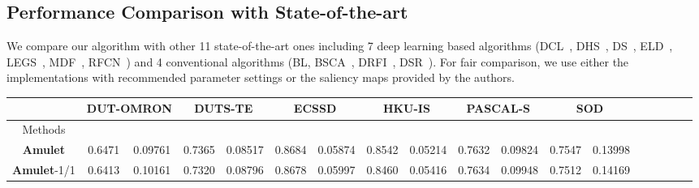 \documentclass[10pt,twocolumn,letterpaper]{article}
\begin{document}
\subsection{Performance Comparison with State-of-the-art}
We compare our algorithm with other 11 state-of-the-art ones including 7 deep learning based algorithms (DCL~\cite{LiYu16}, DHS~\cite{liu2016dhsnet}, DS~\cite{Li2016DeepSaliency}, ELD~\cite{lee2016deep}, LEGS~\cite{wang2015deep}, MDF~\cite{zhao2015saliency}, RFCN~\cite{wang2016saliency})
and 4 conventional algorithms (BL\cite{tong2015bootstrap}, BSCA~\cite{qin2015saliency}, DRFI~\cite{jiang2013salient}, DSR~\cite{li2013saliency}).
For fair comparison, we use either the implementations with recommended parameter settings or the saliency maps provided by the authors.
\setlength{\tabcolsep}{2.95pt}
\begin{table*}
\vspace{-5mm}
\begin{center}
\doublerulesep=0.6pt
\begin{tabular}{|c|c|c|c|c|c|c|c|c|c|c|c|c|c|c|c|c|c|c|c|c|c|c|c|c|||c|c|c|c|c|c|c|c|||}
\hline
\multicolumn{4}{|c|}{}
&\multicolumn{4}{|c|}{DUT-OMRON}
&\multicolumn{4}{|c|}{DUTS-TE}
&\multicolumn{4}{|c|}{ECSSD}
&\multicolumn{4}{|c|}{HKU-IS}
&\multicolumn{4}{|c|}{PASCAL-S}
&\multicolumn{4}{|c|}{SOD}
\\
\hline
\multicolumn{4}{|c|}{Methods}
&\multicolumn{2}{|c|}{}&\multicolumn{2}{|c|}{}&\multicolumn{2}{|c|}{}&\multicolumn{2}{|c|}{}&\multicolumn{2}{|c|}{}&\multicolumn{2}{|c|}{}&\multicolumn{2}{|c|}{}&\multicolumn{2}{|c|}{}&\multicolumn{2}{|c|}{}&\multicolumn{2}{|c|}{}&\multicolumn{2}{|c|}{}&\multicolumn{2}{|c|}{}\\
\hline
\multicolumn{4}{|c|}{\textbf{Amulet}}
&\multicolumn{2}{|c|}{\textcolor[rgb]{0,1,0}{0.6471}}&\multicolumn{2}{|c|}{\textcolor[rgb]{0,0,1}{0.09761}}&\multicolumn{2}{|c|}{\textcolor[rgb]{1,0,0}{0.7365}}&\multicolumn{2}{|c|}{\textcolor[rgb]{0,1,0}{0.08517}}&\multicolumn{2}{|c|}{\textcolor[rgb]{1,0,0}{0.8684}}&\multicolumn{2}{|c|}{\textcolor[rgb]{1,0,0}{0.05874}}&\multicolumn{2}{|c|}{\textcolor[rgb]{1,0,0}{0.8542}}&\multicolumn{2}{|c|}{\textcolor[rgb]{1,0,0}{0.05214}}&\multicolumn{2}{|c|}{\textcolor[rgb]{0,0,1}{0.7632}}&\multicolumn{2}{|c|}{\textcolor[rgb]{0,1,0}{0.09824}}&\multicolumn{2}{|c|}{\textcolor[rgb]{0,1,0}{0.7547}}&\multicolumn{2}{|c|}{\textcolor[rgb]{0,1,0}{0.13998}}\\
\multicolumn{4}{|c|}{\textbf{Amulet}-1/1}
&\multicolumn{2}{|c|}{0.6413}&\multicolumn{2}{|c|}{0.10161}&\multicolumn{2}{|c|}{\textcolor[rgb]{0,0,1}{0.7320}}&\multicolumn{2}{|c|}{\textcolor[rgb]{0,0,1}{0.08796}}&\multicolumn{2}{|c|}{\textcolor[rgb]{0,1,0}{0.8678}}&\multicolumn{2}{|c|}{\textcolor[rgb]{0,0,1}{0.05997}}&\multicolumn{2}{|c|}{\textcolor[rgb]{0,0,1}{0.8460}}&\multicolumn{2}{|c|}{\textcolor[rgb]{0,0,1}{0.05416}}&\multicolumn{2}{|c|}{\textcolor[rgb]{0,1,0}{0.7634}}&\multicolumn{2}{|c|}{\textcolor[rgb]{0,0,1}{0.09948}}&\multicolumn{2}{|c|}{\textcolor[rgb]{0,0,1}{0.7512}}&\multicolumn{2}{|c|}{\textcolor[rgb]{0,0,1}{0.14169}}\\

\end{tabular}
\end{center}
\end{table*}
\end{document}
